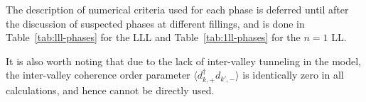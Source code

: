 The description of numerical criteria used for each phase is deferred until after the discussion of suspected phases at different fillings, and is done in Table~\ref{tab:lll-phases} for the LLL and Table~\ref{tab:1ll-phases} for the $n=1$ LL.

It is also worth noting that due to the lack of inter-valley tunneling in the model, the inter-valley coherence order parameter $\langle d^\dagger_{k,+} d_{k',-} \rangle$ is identically zero in all calculations, and hence cannot be directly used.